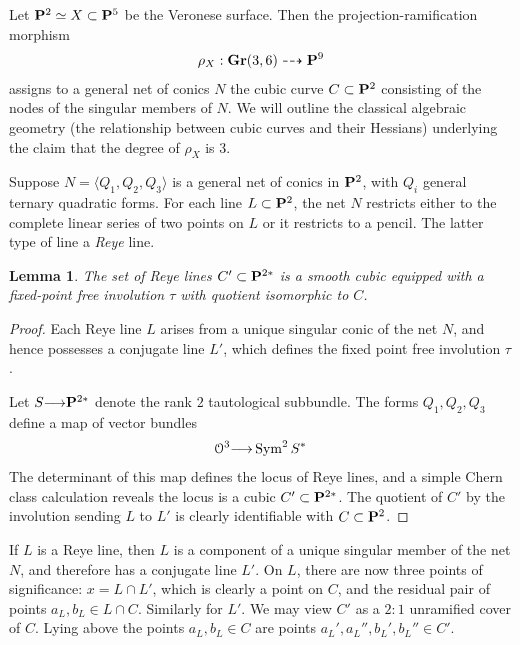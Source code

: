 \documentclass[11pt,reqno]{amsart}
\theoremstyle{plain}
\newtheorem{lemma}[theorem]{Lemma}
\theoremstyle{definition}
\theoremstyle{remark}
\numberwithin{equation}{section}
\renewcommand{\to}{{\longrightarrow}}
\numberwithin{equation}{section}
\renewcommand{\O}{\mathcal O}
\begin{document}
Let $\P^{2} \simeq X \subset \P^{5}$ be the Veronese surface. Then the projection-ramification morphism 
\begin{align*}
  \rho_{X}: \Gr(3,6) \dashrightarrow \P^{9}
\end{align*}
assigns to a general net of conics $N$ the cubic curve $C \subset \P^{2}$ consisting of the nodes of the singular members of $N$.  We will outline the classical algebraic geometry (the relationship between cubic curves and their Hessians) underlying the claim that the degree of $\rho_{X}$ is $3$. 

Suppose $N = \langle Q_{1}, Q_{2}, Q_{3} \rangle$ is a general net of conics in $\P^{2}$, with $Q_{i}$ general ternary quadratic forms. For each line $L \subset \P^{2}$, the net $N$ restricts either to the complete linear series of two points on $L$ or it restricts to a pencil.   The latter type of line a {\sl Reye} line. 

\begin{lemma}
   \label{lem:specialLines}
   The set of Reye lines $C' \subset \P^{2*}$ is a smooth  cubic equipped with a fixed-point free involution $\tau$ with quotient isomorphic to $C$.
 \end{lemma}  

\begin{proof}
  Each Reye line $L$ arises from a unique singular conic of the net $N$, and hence possesses a conjugate line $L'$, which defines the fixed point free involution $\tau$. 

  Let $S \to \P^{2*}$ denote the rank $2$ tautological subbundle. The forms $Q_{1},Q_{2},Q_{3}$ define a map of vector bundles 
  \begin{align*}
    \O^{3} \to \Sym^{2}S^{*}
  \end{align*}
  The determinant of this map defines the locus of Reye lines, and a simple Chern class calculation reveals the locus is a cubic $C' \subset \P^{2*}$.  The quotient of $C'$ by the involution sending $L$ to $L'$ is clearly identifiable with $C \subset \P^{2}$.
\end{proof}


If $L$ is a Reye line, then $L$ is a component of a unique singular member of the net $N$, and therefore has a conjugate line $L'$.  On $L$, there are now three points of significance: $x = L \cap L'$, which is clearly a point on $C$, and the residual pair of points $a_{L}, b_{L} \in L \cap C$. Similarly for $L'$.  We may view $C'$ as a $2:1$ unramified cover of $C$. Lying above the points $a_{L},b_{L} \in C$ are points $a_{L}',a_{L}'', b_{L}', b_{L}'' \in C'$. 
\end{document}
